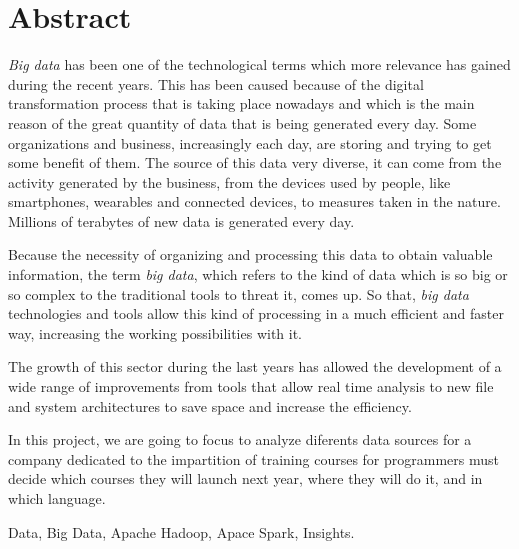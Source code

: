\chapter*{Abstract}

\begin{abstractEn}
	\textit{Big data} has been one of the technological terms which more relevance has gained during the recent years. This has been caused because of the digital transformation process that is taking place nowadays and which is the main reason of the great quantity of data that is being generated every day. Some organizations and business, increasingly each day, are storing and trying to get some benefit of them. The source of this data very diverse, it can come from the activity generated by the business, from the devices used by people, like smartphones, wearables and connected devices, to measures taken in the nature. Millions of terabytes of new data is generated every day.
	
	Because the necessity of organizing and processing this data to obtain valuable information, the term \textit{big data}, which refers to the kind of data which is so big or so complex to the traditional tools to threat it, comes up. So that, \textit{big data} technologies and tools allow this kind of processing in a much efficient and faster way, increasing the working possibilities with it.
	
	The growth of this sector during the last years has allowed the development of a wide range of improvements from tools that allow real time analysis to new file and system architectures to save space and increase the efficiency.
	
	In this project, we are going to focus to analyze diferents data sources for a company dedicated to the impartition of training courses for programmers must decide which courses they will launch next year, where they will do it, and in which language.
	
	
\end{abstractEn}

\begin{keywordsEn}
	Data, Big Data, Apache Hadoop, Apace Spark, Insights.
\end{keywordsEn}
